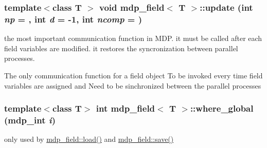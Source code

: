 \label{classmdp__field_a8db821b09a101730bcbcf27ccd1a25f5}
\hypertarget{classmdp__field_a72b973da706841ea58dc728345d36795}{
\subsubsection[{update}]{\setlength{\rightskip}{0pt plus 5cm}template$<$class T $>$ void {\bf mdp\_\-field}$<$ T $>$::update (int {\em np} = {}, \/  int {\em d} = {\ttfamily -\/1}, \/  int {\em ncomp} = {})}}
\label{classmdp__field_a72b973da706841ea58dc728345d36795}
the most important communication function in MDP. it must be called after each field variables are modified. it restores the syncronization between parallel processes.

The only communication function for a field object To be invoked every time field variables are assigned and Need to be sinchronized between the parallel processes \hypertarget{classmdp__field_ac8422b94f444285b0d34748ed6b7c06f}{
\subsubsection[{where\_\-global}]{\setlength{\rightskip}{0pt plus 5cm}template$<$class T$>$ int {\bf mdp\_\-field}$<$ T $>$::where\_\-global ({\bf mdp\_\-int} {\em i})}}
\label{classmdp__field_ac8422b94f444285b0d34748ed6b7c06f}


only used by \hyperlink{classmdp__field_a21ce8e89744a826abdc9f5325c714892}{mdp\_\-field::load()} and \hyperlink{classmdp__field_a66bbe9d66cc3ad2a5955282df3519471}{mdp\_\-field::save()} 

